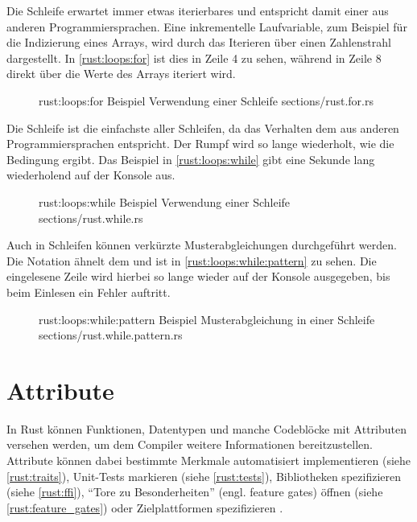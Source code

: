 Die  Schleife erwartet immer etwas iterierbares und entspricht damit einer  aus anderen Programmiersprachen.
Eine inkrementelle Laufvariable, zum Beispiel für die Indizierung eines Arrays, wird durch das Iterieren über einen Zahlenstrahl dargestellt.
In \autoref{rust:loops:for} ist dies in Zeile 4 zu sehen, während in Zeile 8 direkt über die Werte des Arrays iteriert wird.

\begin{figure}[H]
	\rustcinclude
		{rust:loops:for}
		{Beispiel Verwendung einer  Schleife}
		{sections/rust.for.rs}
\end{figure}


Die  Schleife ist die einfachste aller Schleifen, da das Verhalten dem aus anderen Programmiersprachen entspricht.
Der Rumpf wird so lange wiederholt, wie die Bedingung  ergibt.
Das Beispiel in \autoref{rust:loops:while} gibt eine Sekunde lang wiederholend  auf der Konsole aus.


\begin{figure}[H]
	\rustcinclude
		{rust:loops:while}
		{Beispiel Verwendung einer  Schleife}
		{sections/rust.while.rs}
\end{figure}

Auch in  Schleifen können verkürzte Musterabgleichungen durchgeführt werden.
Die Notation ähnelt dem  und ist in \autoref{rust:loops:while:pattern} zu sehen.
Die eingelesene Zeile wird hierbei so lange wieder auf der Konsole ausgegeben, bis beim Einlesen ein Fehler auftritt.

\begin{figure}[H]
	\rustcinclude
		{rust:loops:while:pattern}
		{Beispiel Musterabgleichung in einer  Schleife}
		{sections/rust.while.pattern.rs}
\end{figure}

\section{Attribute}
\label{rust:attributes}

In Rust können Funktionen, Datentypen und manche Codeblöcke mit Attributen versehen werden, um dem Compiler weitere Informationen bereitzustellen.
Attribute können dabei bestimmte Merkmale automatisiert implementieren (siehe \autoref{rust:traits}), Unit-Tests markieren (siehe \autoref{rust:tests}), Bibliotheken spezifizieren (siehe \autoref{rust:ffi}), \enquote{Tore zu Besonderheiten} (engl. feature gates) öffnen (siehe \autoref{rust:feature_gates})  oder  Zielplattformen spezifizieren \cite{rust:book:attribute:cfg}.

